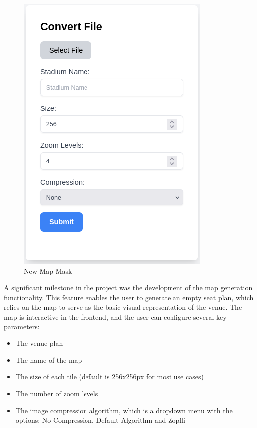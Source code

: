 
\begin{figure}
    \begin{center}
        \includegraphics[scale=0.5]{pics/new_map_mask.png}
        \caption{New Map Mask}
        \label{fig:impl:mapgen}
    \end{center}
\end{figure}

A significant milestone in the project was the development of the map generation functionality. This feature enables the user to generate an empty seat plan, which relies on the map to serve as the basic visual representation of the venue. The map is interactive in the frontend, and the user can configure several key parameters:

\begin{itemize} 
    \item The venue plan 
    \item The name of the map 
    \item The size of each tile (default is 256x256px for most use cases) 
    \item The number of zoom levels 
    \item The image compression algorithm, which is a dropdown menu with the options: No Compression, Default Algorithm and Zopfli \end{itemize}

